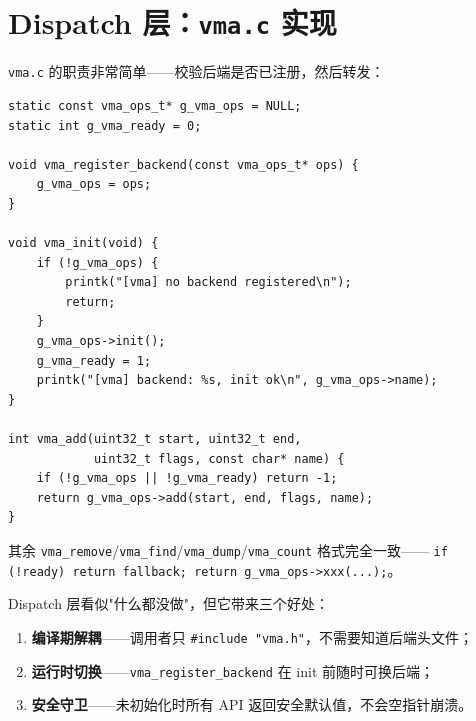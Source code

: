 \section{Dispatch 层：\texttt{vma.c} 实现}

\texttt{vma.c} 的职责非常简单——校验后端是否已注册，然后转发：

\begin{lstlisting}[style=cstyle]
static const vma_ops_t* g_vma_ops = NULL;
static int g_vma_ready = 0;

void vma_register_backend(const vma_ops_t* ops) {
    g_vma_ops = ops;
}

void vma_init(void) {
    if (!g_vma_ops) {
        printk("[vma] no backend registered\n");
        return;
    }
    g_vma_ops->init();
    g_vma_ready = 1;
    printk("[vma] backend: %s, init ok\n", g_vma_ops->name);
}

int vma_add(uint32_t start, uint32_t end,
            uint32_t flags, const char* name) {
    if (!g_vma_ops || !g_vma_ready) return -1;
    return g_vma_ops->add(start, end, flags, name);
}
\end{lstlisting}

其余 \texttt{vma\_remove}/\texttt{vma\_find}/\texttt{vma\_dump}/\texttt{vma\_count}
格式完全一致—— \texttt{if (!ready) return fallback; return g\_vma\_ops->xxx(...);}。

\begin{designbox}
Dispatch 层看似"什么都没做"，但它带来三个好处：
\begin{enumerate}
  \item \textbf{编译期解耦}——调用者只 \texttt{\#include "vma.h"}，不需要知道后端头文件；
  \item \textbf{运行时切换}——\texttt{vma\_register\_backend} 在 init 前随时可换后端；
  \item \textbf{安全守卫}——未初始化时所有 API 返回安全默认值，不会空指针崩溃。
\end{enumerate}
\end{designbox}


